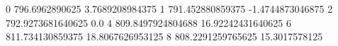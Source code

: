 0 796.6962890625 3.7689208984375
1 791.452880859375 -1.4744873046875
2 792.9273681640625 0.0
4 809.8497924804688 16.92242431640625
6 811.734130859375 18.8067626953125
8 808.2291259765625 15.3017578125
